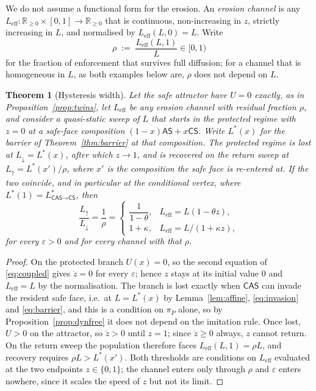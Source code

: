\documentclass[pdflatex]{sn-jnl}
\theoremstyle{thmstyleone}
\newtheorem{theorem}{Theorem}
\theoremstyle{thmstylethree}
\theoremstyle{thmstyletwo}
\newcommand{\AS}{\textsf{AS}}
\newcommand{\CS}{\textsf{CS}}
\newcommand{\CAS}{\textsf{CAS}}
\newcommand{\piP}{\pi_{P}}
\newcommand{\R}{\mathbb{R}}
\begin{document}
We do not assume a functional form for the erosion. An \emph{erosion channel}
is any $L_{\mathrm{eff}}:\R_{\ge0}\times[0,1]\to\R_{\ge0}$ that is continuous,
non-increasing in $z$, strictly increasing in $L$, and normalised by
$L_{\mathrm{eff}}(L,0)=L$. Write
\begin{equation}
\rho \;:=\; \frac{L_{\mathrm{eff}}(L,1)}{L}\in[0,1)
\label{eq:rho}
\end{equation}
for the fraction of enforcement that survives full diffusion; for a channel
that is homogeneous in $L$, as both examples below are, $\rho$ does not depend
on $L$.

\begin{theorem}[Hysteresis width]\label{thm:hysteresis}
Let the safe attractor have $U=0$ exactly, as in
Proposition~\ref{prop:twins}, let $L_{\mathrm{eff}}$ be any erosion channel
with residual fraction $\rho$, and consider a quasi-static sweep of $L$ that
starts in the protected regime with $z=0$ at a safe-face composition
$(1-x)\AS+x\CS$. Write $L^{*}(x)$ for the barrier of
Theorem~\ref{thm:barrier} at that composition. The protected regime is lost at
$L_{\downarrow}=L^{*}(x)$, after which $z\to 1$, and is recovered on the
return sweep at $L_{\uparrow}=L^{*}(x')/\rho$, where $x'$ is the composition
the safe face is re-entered at. If the two coincide, and in particular at the
conditional vertex, where $L^{*}(1)=L^{*}_{\CAS\to\CS}$, then
\begin{equation}
\frac{L_{\uparrow}}{L_{\downarrow}}=\frac{1}{\rho}
=\begin{cases}
\dfrac{1}{1-\theta}, & L_{\mathrm{eff}}=L(1-\theta z),\\[8pt]
1+\kappa, & L_{\mathrm{eff}}=L/(1+\kappa z),
\end{cases}
\label{eq:width}
\end{equation}
for every $\varepsilon>0$ and for every channel with that $\rho$.
\end{theorem}

\begin{proof}
On the protected branch $U(x)=0$, so the second equation of \eqref{eq:coupled}
gives $\dot z=0$ for every $\varepsilon$; hence $z$ stays at its initial value
$0$ and $L_{\mathrm{eff}}=L$ by the normalisation. The branch is lost exactly
when $\CAS$ can invade the resident safe face, i.e.\ at $L=L^{*}(x)$ by
Lemma~\ref{lem:affine}, \eqref{eq:invasion} and \eqref{eq:barrier}, and this
is a condition on $\piP$ alone, so by Proposition~\ref{prop:dynfree} it does
not depend on the imitation rule. Once lost, $U>0$ on the attractor, so
$\dot z>0$ until $z=1$; since $\dot z\ge0$ always, $z$ cannot return. On the
return sweep the population therefore faces $L_{\mathrm{eff}}(L,1)=\rho L$,
and recovery requires $\rho L>L^{*}(x')$. Both thresholds are conditions on
$L_{\mathrm{eff}}$ evaluated at the two endpoints $z\in\{0,1\}$; the channel
enters only through $\rho$ and $\varepsilon$ enters nowhere, since it scales
the speed of $z$ but not its limit.
\end{proof}
\end{document}
